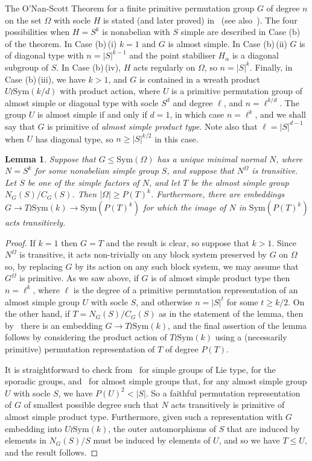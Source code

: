 \documentclass[12pt,a4paper]{article}
\newcommand{\Sym}{\mathrm{Sym}}
\newtheorem{lemma}[theorem]{Lemma} %
\begin{document}
The O'Nan-Scott Theorem for a finite primitive permutation group $G$ of degree
$n$ on the set $\Omega$ with socle $H$ is stated (and later proved)
in~\cite[Theorem 4.1A]{DM} (see also~\cite[Theorem 4.6A]{DM}).
The four possibilities when $H=S^k$ is nonabelian with $S$ simple are described
in Case (b) of the theorem. In Case (b)\,(i) $k=1$ and $G$ is almost simple.
In Case (b)\,(ii) $G$ is of diagonal type with $n=|S|^{k-1}$ and the point
stabiliser $H_\alpha$ is a diagonal subgroup of $S$.
In Case (b)\,(iv), $H$ acts regularly on $\Omega$, so $n=|S|^k$. Finally, in
Case (b)\,(iii), we have $k>1$, and $G$ is contained in a wreath product
$U \wr \Sym(k/d)$ with product action, where $U$ is a primitive permutation
group of almost simple or diagonal type with socle $S^d$ and degree $\ell$,
and $n = \ell^{k/d}$.
The group $U$ is almost simple if and only if $d=1$, in which case $n =\ell^k$,
and we shall say that $G$ is primitive of \emph{almost simple product type}.
Note also that $\ell = |S|^{d-1}$ when $U$ has diagonal type, so
$n \ge |S|^{k/2}$ in this case.

\begin{lemma}\label{lem:minprimdeg}
Suppose that $G \le \Sym(\Omega)$ has a unique minimal normal $N$, where
$N = S^k$ for some nonabelian simple group $S$, and suppose that $N^\Omega$
is transitive. Let $S$ be one of the simple factors of $N$, and let $T$ be
the almost simple group $N_G(S)/C_G(S)$. Then $|\Omega| \ge P(T)^k$.
Furthermore, there are embeddings $G \to T \wr \Sym(k) \to \Sym(P(T)^k)$ for
which the image of $N$ in $\Sym(P(T)^k)$ acts transitively.
\end{lemma}
\begin{proof} If $k=1$ then $G=T$ and the result is clear, so suppose that
$k>1$.  Since $N^\Omega$ is transitive, it acts non-trivially on any
block system preserved by $G$ on $\Omega$ so, by replacing $G$ by its action on any such block system, we may assume that $G^\Omega$ is primitive.
As we saw above, if $G$ is of almost simple product type then $n = \ell^k$,
where $\ell$ is the degree of a primitive permutation representation of an
almost simple group $U$ with socle $S$, and otherwise $n = |S|^t$ for some
$t \ge k/2$.
On the other hand, if $T = N_G(S)/C_G(S)$ as in the statement of the lemma,
then by~\cite[Section 3.2]{CH04} there is an embedding $G \to T \wr \Sym(k)$,
and the final assertion of the lemma follows by considering the product
action of $T \wr \Sym(k)$ using a (necessarily primitive) permutation
representation of $T$ of degree $P(T)$.

It is straightforward to check from~\cite[Table 4]{Guestetal} for simple groups
of Lie type, \cite{Atlas} for the sporadic groups,
and~\cite[Proposition 2.2]{CHU} for almost simple groups that, for any almost
simple group $U$ with socle $S$, we have $P(U)^2 < |S|$. So a faithful
permutation representation of $G$ of smallest possible degree such that $N$
acts transitively is primitive of almost simple product type. Furthermore,
given such a representation with $G$ embedding into $U \wr \Sym(k)$, the outer
automorphisms of $S$ that are induced by elements in $N_G(S)/S$ must be induced
by elements of $U$, and so we have $T \le U$, and the result follows.
\end{proof}
\end{document}
